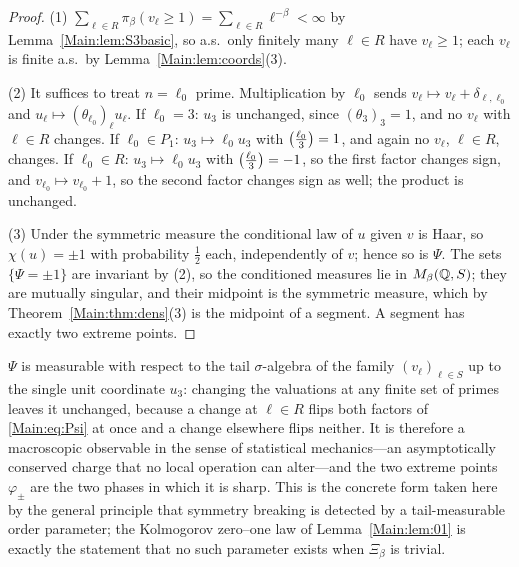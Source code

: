 \begin{proof}
(1) $\sum_{\ell\in R}\pi_\beta(v_\ell\ge1)=\sum_{\ell\in R}\ell^{-\beta}<\infty$
by Lemma~\ref{Main:lem:S3basic}, so a.s.\ only finitely many $\ell\in R$ have
$v_\ell\ge1$; each $v_\ell$ is finite a.s.\ by Lemma~\ref{Main:lem:coords}(3).

(2) It suffices to treat $n=\ell_0$ prime. Multiplication by $\ell_0$ sends
$v_\ell\mapsto v_\ell+\delta_{\ell,\ell_0}$ and $u_\ell\mapsto(\theta_{\ell_0})_\ell u_\ell$.
If $\ell_0=3$: $u_3$ is unchanged, since $(\theta_3)_3=1$, and no $v_\ell$ with
$\ell\in R$ changes. If $\ell_0\in P_1$: $u_3\mapsto\ell_0u_3$ with
$\left(\frac{\ell_0}{3}\right)=1$, and again no $v_\ell$, $\ell\in R$, changes. If
$\ell_0\in R$: $u_3\mapsto\ell_0u_3$ with $\left(\frac{\ell_0}{3}\right)=-1$, so the first
factor changes sign, and $v_{\ell_0}\mapsto v_{\ell_0}+1$, so the second factor
changes sign as well; the product is unchanged.

(3) Under the symmetric measure the conditional law of $u$ given $v$ is Haar, so
$\chi(u)=\pm1$ with probability $\tfrac12$ each, independently of $v$; hence so
is $\Psi$. The sets $\{\Psi=\pm1\}$ are invariant by (2), so the conditioned
measures lie in $M_\beta(\mathbb{Q},S)$; they are mutually singular, and their midpoint
is the symmetric measure, which by Theorem~\ref{Main:thm:dens}(3) is the midpoint of
a segment. A segment has exactly two extreme points.
\end{proof}

\begin{remark}\label{Main:rem:order}
$\Psi$ is measurable with respect to the tail $\sigma$-algebra of the family
$(v_\ell)_{\ell\in S}$ up to the single unit coordinate $u_3$: changing the valuations at
any finite set of primes leaves it unchanged, because a change at $\ell\in R$ flips both
factors of \eqref{Main:eq:Psi} at once and a change elsewhere flips neither. It is therefore a
macroscopic observable in the sense of statistical mechanics---an asymptotically conserved
charge that no local operation can alter---and the two extreme points $\varphi_\pm$ are the
two phases in which it is sharp. This is the concrete form taken here by the general
principle that symmetry breaking is detected by a tail-measurable order parameter; the
Kolmogorov zero--one law of Lemma~\ref{Main:lem:01} is exactly the statement that no such
parameter exists when $\Xi_\beta$ is trivial.
\end{remark}

